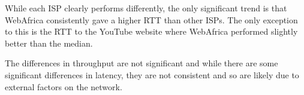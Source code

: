 \documentclass{sig-alternate-05-2015}
\begin{document}
\begin{table}
	\caption{Offset from median RTT to content (ms, lower is better)}
	\label{table:OffsetFromMedianPingToContent}
\end{table}

\begin{table}
	\caption{Offset from median throughput (KB/s, higher is better)}
	\label{table:OffsetFromMedianThroughput}
\end{table}
While each ISP clearly performs differently, the only significant trend is that WebAfrica consistently gave a higher RTT than other ISPs. The only exception to this is the RTT to the YouTube website where WebAfrica performed slightly better than the median.

The differences in throughput are not significant and while there are some significant differences in latency, they are not consistent and so are likely due to external factors on the network.
\\\\
\end{document}
